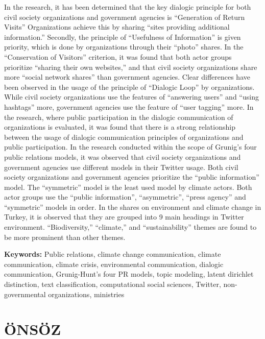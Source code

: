 \documentclass[
]{book}
\begin{document}
In the research, it has been determined that the key dialogic principle for both civil society organizations and government agencies is ``Generation of Return Visits'' Organizations achieve this by sharing ``sites providing additional information.'' Secondly, the principle of ``Usefulness of Information'' is given priority, which is done by organizations through their ``photo'' shares. In the ``Conservation of Visitors'' criterion, it was found that both actor groups prioritize ``sharing their own websites,'' and that civil society organizations share more ``social network shares'' than government agencies. Clear differences have been observed in the usage of the principle of ``Dialogic Loop'' by organizations. While civil society organizations use the features of ``answering users'' and ``using hashtags'' more, government agencies use the feature of ``user tagging'' more. In the research, where public participation in the dialogic communication of organizations is evaluated, it was found that there is a strong relationship between the usage of dialogic communication principles of organizations and public participation. In the research conducted within the scope of Grunig's four public relations models, it was observed that civil society organizations and government agencies use different models in their Twitter usage. Both civil society organizations and government agencies prioritize the ``public information'' model. The ``symmetric'' model is the least used model by climate actors. Both actor groups use the ``public information'', ``asymmetric'', ``press agency'' and ``symmetric'' models in order. In the shares on environment and climate change in Turkey, it is observed that they are grouped into 9 main headings in Twitter environment. ``Biodiversity,'' ``climate,'' and ``sustainability'' themes are found to be more prominent than other themes.

\textbf{Keywords:} Public relations, climate change communication, climate communication, climate crisis, environmental communication, dialogic communication, Grunig-Hunt's four PR models, topic modeling, latent dirichlet distinction, text classification, computational social sciences, Twitter, non-governmental organizations, ministries

\hypertarget{uxf6nsuxf6z}{%
\chapter*{ÖNSÖZ}\label{uxf6nsuxf6z}}
\end{document}
